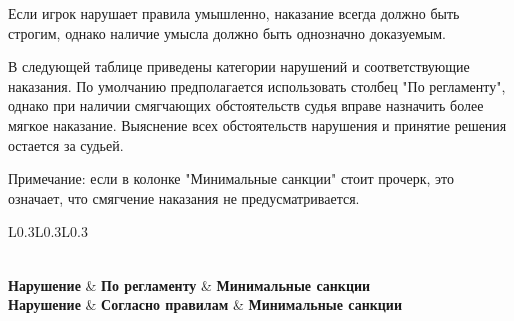 Если игрок нарушает правила умышленно, наказание всегда должно быть строгим, однако наличие умысла должно быть однозначно доказуемым.

В следующей таблице приведены категории нарушений и соответствующие наказания. По умолчанию предполагается использовать столбец "По регламенту", однако при наличии смягчающих обстоятельств судья вправе назначить более мягкое наказание. Выяснение всех обстоятельств нарушения и принятие решения остается за судьей. 

Примечание: если в колонке "Минимальные санкции" стоит прочерк, это означает, что смягчение наказания не предусматривается.

\noindent\begin{tabularx}{\linewidth}{L{0.3\linewidth}L{0.3\linewidth}L{0.3\linewidth}}
	\caption{Обоснования штрафов} \\
	\toprule
	\textbf{Нарушение} & \textbf{По регламенту} & \textbf{Минимальные санкции} \\
	\endfirsthead
	\toprule
	\textbf{Нарушение} & \textbf{Согласно правилам} & \textbf{Минимальные санкции} \\
	\midrule
	\endhead
	\endfoot
	\bottomrule
	\endlastfoot


\end{tabularx}
